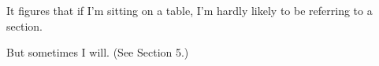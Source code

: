 \documentclass{article}
\begin{document}
It figures that if I'm sitting on a table, I'm hardly likely to be referring to a section. 

But sometimes I will. (See Section 5.)
\end{document}
